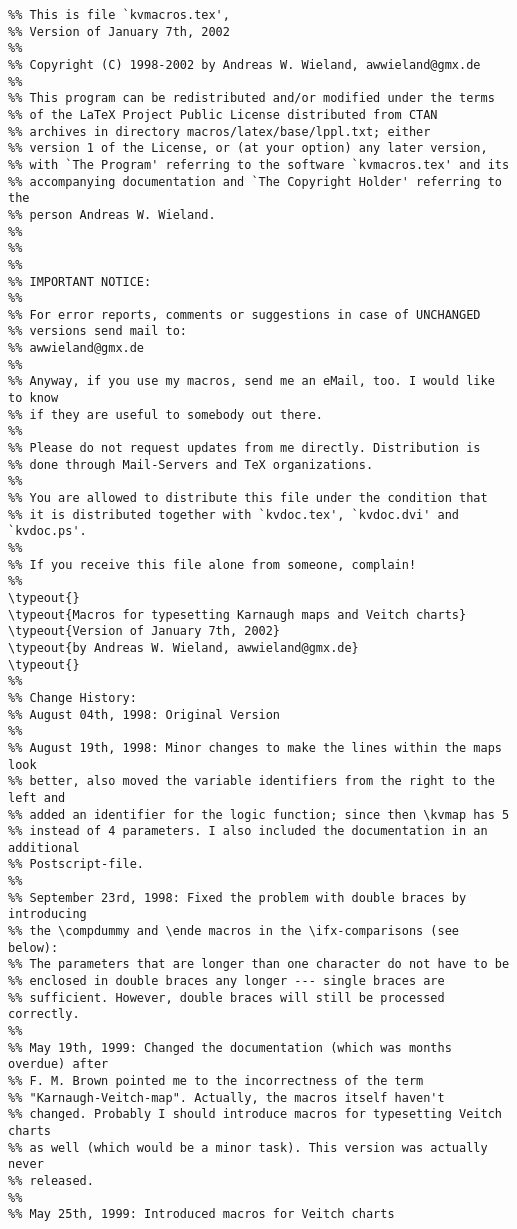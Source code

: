 \documentclass{article}
\begin{document}
\small
\begin{verbatim}
%% This is file `kvmacros.tex',
%% Version of January 7th, 2002
%% 
%% Copyright (C) 1998-2002 by Andreas W. Wieland, awwieland@gmx.de 
%%
%% This program can be redistributed and/or modified under the terms
%% of the LaTeX Project Public License distributed from CTAN
%% archives in directory macros/latex/base/lppl.txt; either
%% version 1 of the License, or (at your option) any later version,
%% with `The Program' referring to the software `kvmacros.tex' and its
%% accompanying documentation and `The Copyright Holder' referring to the
%% person Andreas W. Wieland.
%% 
%% 
%% 
%% IMPORTANT NOTICE: 
%% 
%% For error reports, comments or suggestions in case of UNCHANGED 
%% versions send mail to:
%% awwieland@gmx.de
%% 
%% Anyway, if you use my macros, send me an eMail, too. I would like to know
%% if they are useful to somebody out there.
%%
%% Please do not request updates from me directly. Distribution is 
%% done through Mail-Servers and TeX organizations. 
%% 
%% You are allowed to distribute this file under the condition that 
%% it is distributed together with `kvdoc.tex', `kvdoc.dvi' and `kvdoc.ps'. 
%% 
%% If you receive this file alone from someone, complain! 
%%
\typeout{}
\typeout{Macros for typesetting Karnaugh maps and Veitch charts}
\typeout{Version of January 7th, 2002}
\typeout{by Andreas W. Wieland, awwieland@gmx.de}
\typeout{}
%%
%% Change History:
%% August 04th, 1998: Original Version
%%
%% August 19th, 1998: Minor changes to make the lines within the maps look
%% better, also moved the variable identifiers from the right to the left and
%% added an identifier for the logic function; since then \kvmap has 5
%% instead of 4 parameters. I also included the documentation in an additional
%% Postscript-file.  
%%
%% September 23rd, 1998: Fixed the problem with double braces by introducing
%% the \compdummy and \ende macros in the \ifx-comparisons (see below): 
%% The parameters that are longer than one character do not have to be
%% enclosed in double braces any longer --- single braces are
%% sufficient. However, double braces will still be processed correctly.
%%
%% May 19th, 1999: Changed the documentation (which was months overdue) after
%% F. M. Brown pointed me to the incorrectness of the term
%% "Karnaugh-Veitch-map". Actually, the macros itself haven't
%% changed. Probably I should introduce macros for typesetting Veitch charts
%% as well (which would be a minor task). This version was actually never
%% released. 
%%
%% May 25th, 1999: Introduced macros for Veitch charts

\end{verbatim}
\end{document}
